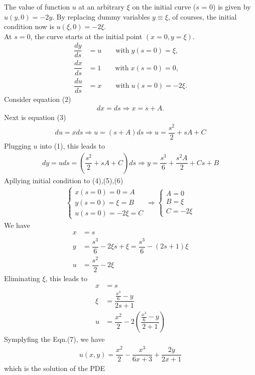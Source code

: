 \documentclass{article}
\newcommand{\f}[2]{\dfrac{#1}{#2}}
\begin{document}
The value of function $u$ at an arbitrary $\xi$ on the initial curve ($s$ = 0) is given by $u(y,0) = -2y$. By replacing dummy variables $y \equiv \xi$, of courses, the initial condition now is $u(\xi,0) = -2\xi$.\\
At $s = 0$, the curve starts at the initial point $(x = 0 , y = \xi)$.
\begin{align*}
	\f{dy}{ds} & = u  \quad\quad \text{with} \; y(s = 0) = \xi, \tag{1}   \\
	\f{dx}{ds} & = 1  \quad\quad \text{with} \; x(s = 0) = 0, \tag{2}     \\
	\f{du}{ds} & = x  \quad\quad \text{with} \; u(s = 0) = -2\xi. \tag{3}
\end{align*}
Consider equation (2)
\begin{align*}
	dx = ds \Rightarrow x = s + A .\tag{4}
\end{align*}
Next is equation (3)
\begin{align*}
	du = x ds \Rightarrow u = (s + A) ds \Rightarrow u = \f{s^{2}}{2} + s A + C \tag{5}
\end{align*}
Plugging $u$ into (1), this leads to
\begin{align*}
	dy = u ds = \left(\f{s^{2}}{2} + s A + C\right) ds \Rightarrow y = \f{s^{3}}{6} + \f{s^{2}A}{2} + C s +  B \tag{6}
\end{align*}
Apllying initial condition to (4),(5),(6)
\begin{align*}
	\begin{cases}
		x(s = 0) = 0 = A   \\
		y(s = 0) = \xi = B \\
		u(s = 0) = -2\xi = C
	\end{cases}
	\Rightarrow
	\begin{cases}
		A = 0   \\
		B = \xi \\
		C = -2\xi
	\end{cases}
\end{align*}
We have
\begin{align*}
	x & = s                           \\
	y & = \f{s^{3}}{6} - 2\xi s + \xi =  \f{s^{3}}{6} - (2s + 1) \xi \\
	u & = \f{s^{2}}{2} - 2\xi
\end{align*}
Eliminating $\xi$, this leads to
\begin{align*}
	x & = s                                             \\
	\xi & = \f{\frac{x^{3}}{6} - y}{2s + 1}                  \\
	u & = \f{x^{2}}{2} - 2 \left( \f{\frac{x^{3}}{6} - y}{2 + 1} \right) \tag{7}
\end{align*}
Symplyfing the Eqn.(7), we have
\begin{align*}
	u(x,y) = \f{x^{2}}{2} - \f{x^{3}}{6x + 3} + \f{2y}{2x + 1}
\end{align*}
which is the solution of the PDE
\end{document}
